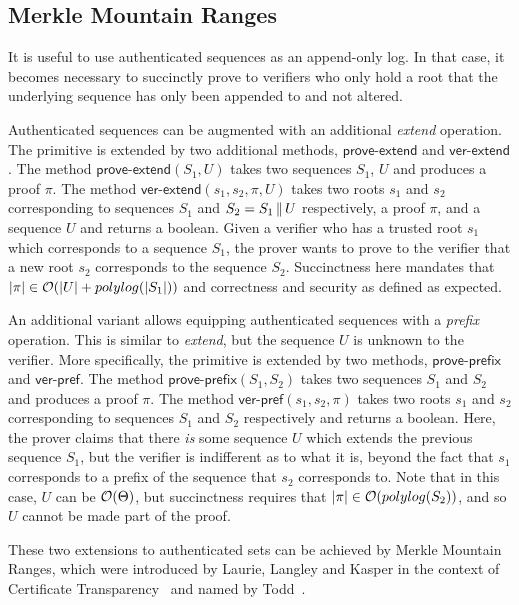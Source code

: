 \subsection{Merkle Mountain Ranges}
It is useful to use authenticated sequences as an append-only
log. In that case, it becomes necessary to succinctly prove to verifiers who only hold
a root that the underlying sequence has only been appended to and not altered.

Authenticated sequences can be augmented with an additional \emph{extend} operation.
The primitive is extended by two additional methods, $\textsf{prove-extend}$ and
$\textsf{ver-extend}$. The method $\textsf{prove-extend}(S_1, U)$ takes two sequences
$S_1$, $U$ and produces a proof $\pi$. The method $\textsf{ver-extend}(s_1, s_2,
\pi, U)$ takes two roots $s_1$ and $s_2$ corresponding to sequences $S_1$ and $S_2 =
S_1 \,\|\, U$ respectively, a proof $\pi$, and a sequence $U$ and returns a boolean.
Given a verifier who has a trusted root $s_1$ which corresponds to a sequence $S_1$,
the prover wants to prove to the verifier that a new root $s_2$ corresponds to
the sequence $S_2$. Succinctness here mandates that $|\pi| \in \mathcal{O}(|U| +
polylog(|S_1|))$ and correctness and security as defined as expected.

An additional variant allows equipping authenticated sequences with a \emph{prefix}
operation. This is similar to \emph{extend}, but the sequence $U$ is unknown to the
verifier. More specifically, the primitive is extended by two methods,
$\textsf{prove-prefix}$ and $\textsf{ver-pref}$. The method
$\textsf{prove-prefix}(S_1, S_2)$ takes two sequences $S_1$ and $S_2$ and produces a
proof $\pi$. The method $\textsf{ver-pref}(s_1, s_2, \pi)$ takes two roots
$s_1$ and $s_2$ corresponding to sequences $S_1$ and $S_2$ respectively and returns a
boolean. Here, the prover claims that there \emph{is} some sequence $U$ which extends
the previous sequence $S_1$, but the verifier is indifferent as to what it is, beyond
the fact that $s_1$ corresponds to a prefix of the sequence that $s_2$ corresponds
to. Note that in this case, $U$ can be $\mathcal{O}(\Theta)$, but succinctness
requires that $|\pi| \in \mathcal{O}(polylog(S_2))$, and so $U$ cannot be made part of
the proof.

These two extensions to authenticated sets can be achieved by Merkle Mountain
Ranges, which were introduced by Laurie, Langley
and Kasper in the context of Certificate Transparency~\cite{ct} and named by
Todd~\cite{mmr}.

